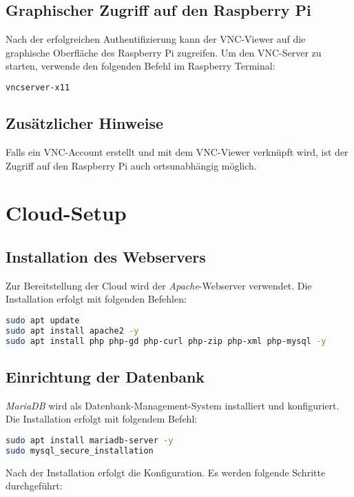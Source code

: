 \documentclass[a4paper,12pt]{article}
\begin{document}
\subsection{Graphischer Zugriff auf den Raspberry Pi}
Nach der erfolgreichen Authentifizierung kann der VNC-Viewer auf die graphische Oberfläche des Raspberry Pi zugreifen. Um den VNC-Server zu starten, verwende den folgenden Befehl im Raspberry Terminal:
\begin{lstlisting}[language=bash]
vncserver-x11
\end{lstlisting}

\subsection{Zusätzlicher Hinweise}
Falls ein VNC-Account erstellt und mit dem VNC-Viewer verknüpft wird, ist der Zugriff auf den Raspberry Pi auch ortsunabhängig möglich.

\section{Cloud-Setup}
\subsection{Installation des Webservers}
Zur Bereitstellung der Cloud wird der \textit{Apache}-Webserver verwendet. Die Installation erfolgt mit folgenden Befehlen:
\begin{lstlisting}[language=bash]
sudo apt update
sudo apt install apache2 -y
sudo apt install php php-gd php-curl php-zip php-xml php-mysql -y
\end{lstlisting}

\subsection{Einrichtung der Datenbank}
\textit{MariaDB} wird als Datenbank-Management-System installiert und konfiguriert. Die Installation erfolgt mit folgendem Befehl:
\begin{lstlisting}[language=bash]
sudo apt install mariadb-server -y
sudo mysql_secure_installation
\end{lstlisting}

Nach der Installation erfolgt die Konfiguration. Es werden folgende Schritte durchgeführt:
\end{document}

